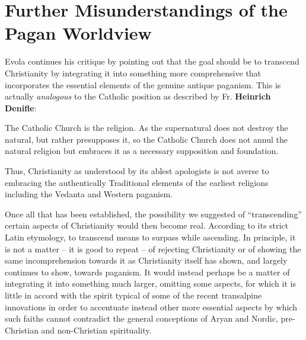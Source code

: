 \section{Further Misunderstandings of the Pagan Worldview}

Evola continues his critique by pointing out that the goal should be to transcend Christianity by integrating it into something more comprehensive that incorporates the essential elements of the genuine antique paganism. This is actually \emph{analogous} to the Catholic position as described by Fr. \textbf{Heinrich Denifle}:

\begin{quotex}
The Catholic Church is the religion. As the supernatural does not destroy the natural, but rather presupposes it, so the Catholic Church does not annul the natural religion but embraces it as a necessary supposition and foundation.
\end{quotex}


Thus, Christianity as understood by its ablest apologists is not averse to embracing the authentically Traditional elements of the earliest religions including the Vedanta and Western paganism.

Once all that has been established, the possibility we suggested of ``transcending'' certain aspects of Christianity would then become real. According to its strict Latin etymology, to transcend means to surpass while ascending. In principle, it is not a matter -- it is good to repeat -- of rejecting Christianity or of showing the same incomprehension towards it as Christianity itself has shown, and largely continues to show, towards paganism. It would instead perhaps be a matter of integrating it into something much larger, omitting some aspects, for which it is little in accord with the spirit typical of some of the recent transalpine innovations in order to accentuate instead other more essential aspects by which such faiths cannot contradict the general conceptions of Aryan and Nordic, pre-Christian and non-Christian spirituality.

